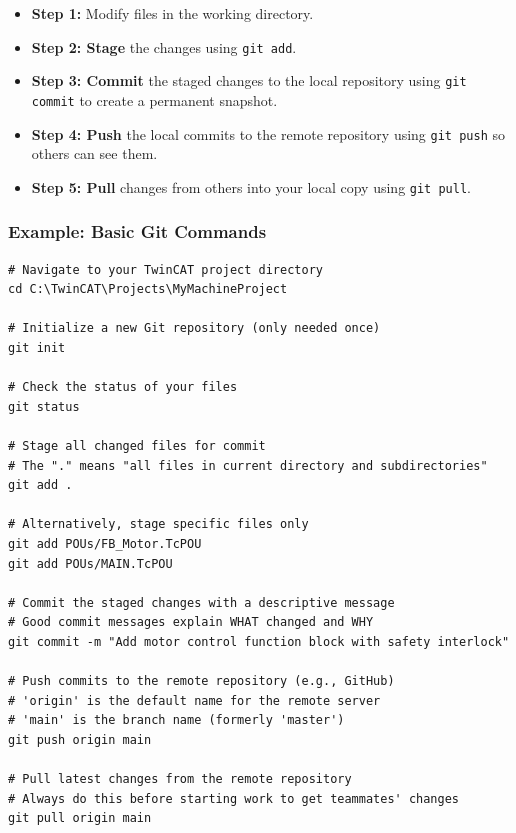 \documentclass[11pt,a4paper]{article}
\begin{document}
\begin{itemize}[leftmargin=*]
    \item \textbf{Step 1:} Modify files in the working directory.
    \item \textbf{Step 2: Stage} the changes using \texttt{git add}.
    \item \textbf{Step 3: Commit} the staged changes to the local repository using \texttt{git commit} to create a permanent snapshot.
    \item \textbf{Step 4: Push} the local commits to the remote repository using \texttt{git push} so others can see them.
    \item \textbf{Step 5: Pull} changes from others into your local copy using \texttt{git pull}.
\end{itemize}

\subsubsection*{Example: Basic Git Commands}

\begin{lstlisting}[style=bashstyle]
# Navigate to your TwinCAT project directory
cd C:\TwinCAT\Projects\MyMachineProject

# Initialize a new Git repository (only needed once)
git init

# Check the status of your files
git status

# Stage all changed files for commit
# The "." means "all files in current directory and subdirectories"
git add .

# Alternatively, stage specific files only
git add POUs/FB_Motor.TcPOU
git add POUs/MAIN.TcPOU

# Commit the staged changes with a descriptive message
# Good commit messages explain WHAT changed and WHY
git commit -m "Add motor control function block with safety interlock"

# Push commits to the remote repository (e.g., GitHub)
# 'origin' is the default name for the remote server
# 'main' is the branch name (formerly 'master')
git push origin main

# Pull latest changes from the remote repository
# Always do this before starting work to get teammates' changes
git pull origin main
\end{lstlisting}
\end{document}
